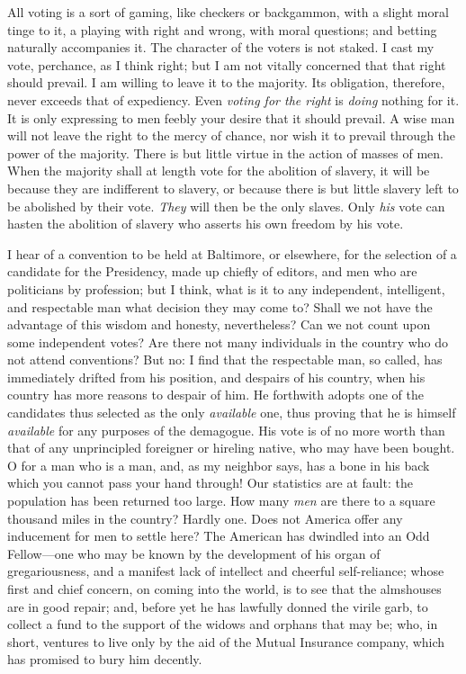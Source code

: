 \documentclass[12pt]{article}
\begin{document}
All voting is a sort of gaming, like checkers or backgammon, with a
slight moral tinge to it, a playing with right and wrong, with moral
questions; and betting naturally accompanies it. The character of the
voters is not staked. I cast my vote, perchance, as I think right; but I
am not vitally concerned that that right should prevail. I am willing to
leave it to the majority. Its obligation, therefore, never exceeds that
of expediency. Even \emph{voting for the right} is \emph{doing} nothing
for it. It is only expressing to men feebly your desire that it should
prevail. A wise man will not leave the right to the mercy of chance, nor
wish it to prevail through the power of the majority. There is but
little virtue in the action of masses of men. When the majority shall at
length vote for the abolition of slavery, it will be because they are
indifferent to slavery, or because there is but little slavery left to
be abolished by their vote. \emph{They} will then be the only slaves.
Only \emph{his} vote can hasten the abolition of slavery who asserts his
own freedom by his vote.

I hear of a convention to be held at Baltimore, or elsewhere, for the
selection of a candidate for the Presidency, made up chiefly of editors,
and men who are politicians by profession; but I think, what is it to
any independent, intelligent, and respectable man what decision they may
come to? Shall we not have the advantage of this wisdom and honesty,
nevertheless? Can we not count upon some independent votes? Are there
not many individuals in the country who do not attend conventions? But
no: I find that the respectable man, so called, has immediately drifted
from his position, and despairs of his country, when his country has
more reasons to despair of him. He forthwith adopts one of the
candidates thus selected as the only \emph{available} one, thus proving
that he is himself \emph{available} for any purposes of the demagogue.
His vote is of no more worth than that of any unprincipled foreigner or
hireling native, who may have been bought. O for a man who is a man,
and, as my neighbor says, has a bone in his back which you cannot pass
your hand through! Our statistics are at fault: the population has been
returned too large. How many \emph{men} are there to a square thousand
miles in the country? Hardly one. Does not America offer any inducement
for men to settle here? The American has dwindled into an Odd
Fellow---one who may be known by the development of his organ of
gregariousness, and a manifest lack of intellect and cheerful
self-reliance; whose first and chief concern, on coming into the world,
is to see that the almshouses are in good repair; and, before yet he has
lawfully donned the virile garb, to collect a fund to the support of the
widows and orphans that may be; who, in short, ventures to live only by
the aid of the Mutual Insurance company, which has promised to bury him
decently.
\end{document}
